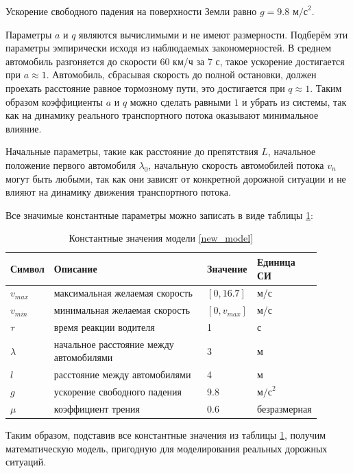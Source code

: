 \documentclass[12pt, a4paper]{extarticle}
\numberwithin{equation}{section}
\begin{document}
Ускорение свободного падения на поверхности Земли равно $g=9.8 \text{ м/с}^2$.

Параметры $a$ и $q$ являются вычислимыми и не имеют размерности. Подберём эти параметры эмпирически исходя из наблюдаемых закономерностей. В среднем автомобиль разгоняется до скорости 60 км/ч за 7 с, такое ускорение достигается при $a\approx1$. Автомобиль, сбрасывая скорость до полной остановки, должен проехать расстояние равное тормозному пути, это достигается при $q\approx1$. Таким образом коэффициенты $a$ и $q$ можно сделать равными $1$ и убрать из системы, так как на динамику реального транспортного потока оказывают минимальное влияние.

Начальные параметры, такие как расстояние до препятствия $L$, начальное положение первого автомобиля $\lambda_0$, начальную скорость автомобилей потока $v_n$ могут быть любыми, так как они зависят от конкретной дорожной ситуации и не влияют на динамику движения транспортного потока.

Все значимые константные параметры можно записать в виде таблицы \ref{real_parameters}:
\begin{table}[h!]
	\caption{Константные значения модели \eqref{new_model} }
	\label{real_parameters}
	\begin{center}
		\begin{tabularx}{\textwidth}{p{0.12\linewidth}p{0.52\linewidth}p{0.11\linewidth}p{0.15\linewidth}}			
			\hline
			\rule{0cm}{0,5cm}
			Символ & Описание & Значение & Единица СИ \\
			[3pt]\hline
			$v_{max}$ & максимальная желаемая скорость& $[0,16.7]$&м/с\\
			$v_{min}$ & минимальная желаемая скорость& $[0,v_{max}]$&м/с\\ 
			$\tau$ & время реакции водителя& 1&с\\
			$\lambda$ & начальное расстояние между автомобилями& 3&м\\
			$l$ & расстояние между автомобилями& 4&м\\
			$g$ & ускорение свободного падения& 9.8&$\text{м/с}^2$\\ 
			$\mu$ &  коэффициент трения& 0.6& безразмерная\\ 
			\hline
		\end{tabularx}
	\end{center}
\end{table}

Таким образом, подставив все константные значения из таблицы \ref{real_parameters}, получим математическую модель, пригодную для моделирования реальных дорожных ситуаций.
\end{document}
